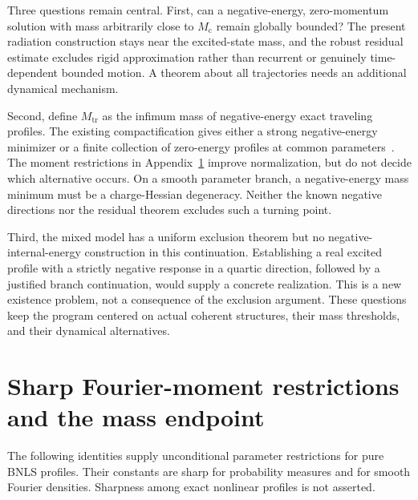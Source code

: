 \documentclass[11pt]{article}
\theoremstyle{definition}
\theoremstyle{remark}
\newcommand{\mc}{M_{\mathrm c}}
\newcommand{\etr}{M_{\mathrm{tr}}}
\begin{document}
Three questions remain central. First, can a negative-energy, zero-momentum solution with mass arbitrarily close to $\mc$ remain globally bounded? The present radiation construction stays near the excited-state mass, and the robust residual estimate excludes rigid approximation rather than recurrent or genuinely time-dependent bounded motion. A theorem about all trajectories needs an additional dynamical mechanism.

Second, define $\etr$ as the infimum mass of negative-energy exact traveling profiles. The existing compactification gives either a strong negative-energy minimizer or a finite collection of zero-energy profiles at common parameters~\cite{ProjectR10}. The moment restrictions in Appendix~\ref{app:moments} improve normalization, but do not decide which alternative occurs. On a smooth parameter branch, a negative-energy mass minimum must be a charge-Hessian degeneracy. Neither the known negative directions nor the residual theorem excludes such a turning point.

Third, the mixed model has a uniform exclusion theorem but no negative-internal-energy construction in this continuation. Establishing a real excited profile with a strictly negative response in a quartic direction, followed by a justified branch continuation, would supply a concrete realization. This is a new existence problem, not a consequence of the exclusion argument. These questions keep the program centered on actual coherent structures, their mass thresholds, and their dynamical alternatives.

\appendix
\section{Sharp Fourier-moment restrictions and the mass endpoint}\label{app:moments}

The following identities supply unconditional parameter restrictions for pure BNLS profiles. Their constants are sharp for probability measures and for smooth Fourier densities. Sharpness among exact nonlinear profiles is not asserted.
\end{document}

